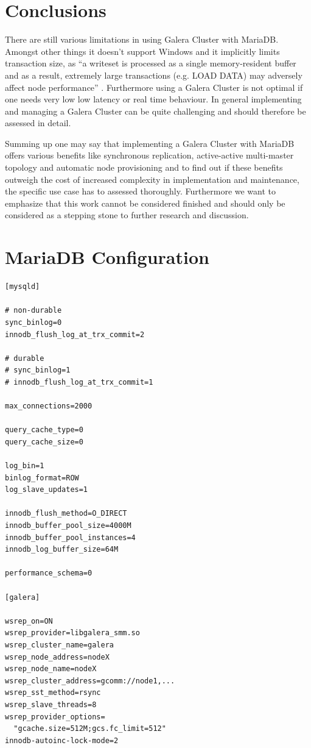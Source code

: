 \documentclass{sig-alternate}
\begin{document}
\section{Conclusions}
There are still various limitations in using Galera Cluster with MariaDB. Amongst other things it doesn’t support Windows and it implicitly limits transaction size, as “a writeset is processed as a single memory-resident buffer and as a result, extremely large transactions (e.g. LOAD DATA) may adversely affect node performance” . Furthermore using a Galera Cluster is not optimal if one needs very low low latency or real time behaviour. In general implementing and managing a Galera Cluster can be quite challenging and should therefore be assessed in detail.

Summing up one may say that implementing a Galera Cluster with MariaDB offers various benefits like synchronous replication, active-active multi-master topology and automatic node provisioning and to find out if these benefits outweigh the cost of increased complexity in implementation and maintenance, the specific use case has to assessed thoroughly. Furthermore we want to emphasize that this work cannot be considered finished and should only be considered as a stepping stone to further research and discussion.

\sloppy
\printbibliography

\appendix
\section{MariaDB Configuration}
\begin{verbatim}
[mysqld]

# non-durable
sync_binlog=0
innodb_flush_log_at_trx_commit=2

# durable
# sync_binlog=1
# innodb_flush_log_at_trx_commit=1

max_connections=2000

query_cache_type=0
query_cache_size=0

log_bin=1
binlog_format=ROW
log_slave_updates=1

innodb_flush_method=O_DIRECT
innodb_buffer_pool_size=4000M
innodb_buffer_pool_instances=4
innodb_log_buffer_size=64M

performance_schema=0

[galera]

wsrep_on=ON
wsrep_provider=libgalera_smm.so
wsrep_cluster_name=galera
wsrep_node_address=nodeX
wsrep_node_name=nodeX
wsrep_cluster_address=gcomm://node1,...
wsrep_sst_method=rsync
wsrep_slave_threads=8
wsrep_provider_options=
  "gcache.size=512M;gcs.fc_limit=512"
innodb-autoinc-lock-mode=2
\end{verbatim}
\end{document}
